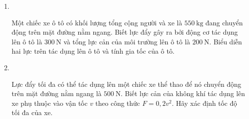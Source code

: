 \begin{enumerate}[label=\bfseries Bài \arabic*:,leftmargin=1.5cm]
{\begin{enumerate}[label=\alph*)]
	\end{enumerate}
}

\item {}\\
{Một chiếc xe ô tô có khối lượng tổng cộng người và xe là $\SI{550}{\kilogram}$ đang chuyển động trên mặt đường nằm ngang. Biết lực đẩy gây ra bởi động cơ tác dụng lên ô tô là $\SI{300}{\newton}$ và tổng lực cản của môi trường lên ô tô là $\SI{200}{\newton}$. Biểu diễn hai lực trên tác dụng lên ô tô và tính gia tốc của ô tô.

}

\item {}\\
{Lực đẩy tối đa có thể tác dụng lên một chiếc xe thể thao để nó chuyển động trên mặt đường nằm ngang là $\SI{500}{\newton}$. Biết lực cản của không khí tác dụng lên xe phụ thuộc vào vận tốc $v$ theo công thức $F=0,2v^2$. Hãy xác định tốc độ tối đa của xe.

}


\end{enumerate}
